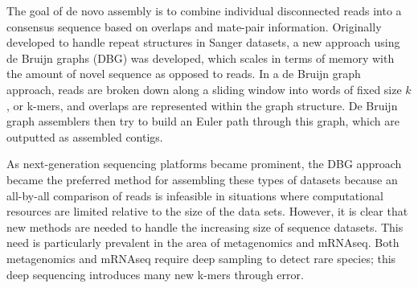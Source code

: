 \documentclass[12pt]{article} \usepackage{simplemargins}
\begin{document}
The goal of de novo assembly is to combine individual disconnected
reads into a consensus sequence based on overlaps and mate-pair
information.
Originally developed to 
handle repeat structures in Sanger datasets, a new approach using de Bruijn 
graphs (DBG) was developed\cite{pmid11504945}, which scales in terms of 
memory with the amount of novel sequence as opposed to reads.
In a de Bruijn
graph approach, reads are broken down along a sliding window into words of fixed
size $k$, or k-mers, and overlaps are represented within the graph 
structure.
De Bruijn graph assemblers then try to build an Euler path through
this graph, which are outputted as assembled contigs\cite{assemblyreview}.

As next-generation sequencing platforms became prominent, the DBG approach
became the preferred method for assembling these types of datasets
because an all-by-all comparison of reads is infeasible in situations where 
computational resources are limited relative to the size of the data sets.  However, it
is clear that new methods are needed to handle the
increasing size of sequence datasets. This need is
particularly prevalent in the area of metagenomics and mRNAseq.  Both
metagenomics and mRNAseq require deep sampling to detect rare species;
this deep sequencing introduces many new k-mers through error.
\end{document}
